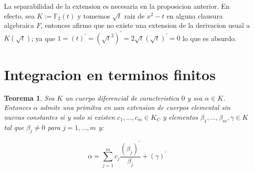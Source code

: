 \documentclass[11pt]{article}
\newcommand{\derivation}[1]{\left(#1\right)^\prime}
\newcommand{\constants}[1]{#1_C}
\newtheorem{theorem}{Teorema}
\numberwithin{theorem}{subsection}
\newenvironment{remark}[1][Observaci\'on]{\begin{trivlist}
		\item[\hskip \labelsep {\bfseries #1}]}{\end{trivlist}}
\begin{document}
\begin{remark}
	La separabilidad de la extension es necesaria en la proposicion anterior. En efecto, sea $K := \mathbb{F}_2 (t)$ y tomemos $\sqrt{t}$ raiz de $x^2 -t$ en alguna clausura algebraica $F$, entonces afirmo que no existe una extension de la derivacion usual a $K(\sqrt{t})$; ya que $1 = \derivation{t} = \derivation{\sqrt{t}^2} = 2 \sqrt{t} \derivation{\sqrt{t}} = 0$ lo que es absurdo.
\end{remark}

\section{Integracion en terminos finitos}

\begin{theorem}
	Sea $K$ un cuerpo diferencial de caracteristica $0$ y sea $\alpha \in K$. Entonces $\alpha$ admite una primitva en uan extension de cuerpos elemental sin nuevas constantes si y solo si existen $c_1, \dots, c_m \in \constants{K}$ y elementos $\beta_1, \dots, \beta_m, \gamma \in K$ tal que $\beta_j \neq 0$ para $j = 1, \dots, m$ y:
	
	\begin{equation}
		\alpha = \sum\limits_{j=1}^{m} c_j \dfrac{\derivation{\beta_j}}{\beta_j} + \derivation{\gamma}
	\end{equation}
	
\end{theorem}
\end{document}
